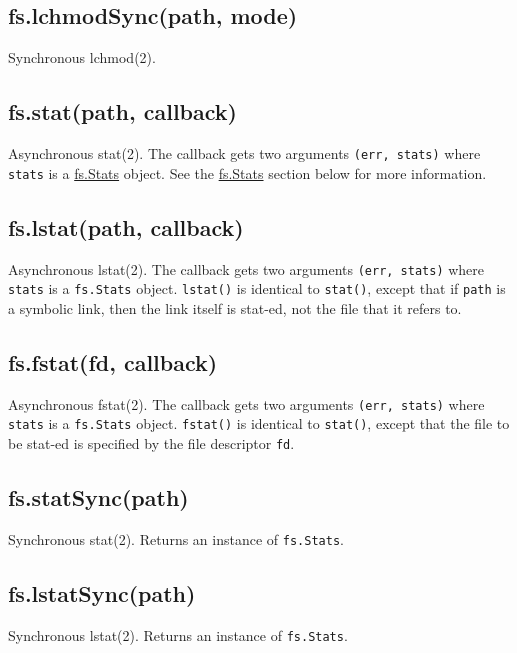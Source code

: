 \subsection{fs.lchmodSync(path, mode)}

Synchronous lchmod(2).

\subsection{fs.stat(path, callback)}

Asynchronous stat(2). The callback gets two arguments
\texttt{(err, stats)} where \texttt{stats} is a
\hyperref[fs_class_fs_stats]{fs.Stats} object. See the
\hyperref[fs_class_fs_stats]{fs.Stats} section below for more
information.

\subsection{fs.lstat(path, callback)}

Asynchronous lstat(2). The callback gets two arguments
\texttt{(err, stats)} where \texttt{stats} is a \texttt{fs.Stats}
object. \texttt{lstat()} is identical to \texttt{stat()}, except that if
\texttt{path} is a symbolic link, then the link itself is stat-ed, not
the file that it refers to.

\subsection{fs.fstat(fd, callback)}

Asynchronous fstat(2). The callback gets two arguments
\texttt{(err, stats)} where \texttt{stats} is a \texttt{fs.Stats}
object. \texttt{fstat()} is identical to \texttt{stat()}, except that
the file to be stat-ed is specified by the file descriptor \texttt{fd}.

\subsection{fs.statSync(path)}

Synchronous stat(2). Returns an instance of \texttt{fs.Stats}.

\subsection{fs.lstatSync(path)}

Synchronous lstat(2). Returns an instance of \texttt{fs.Stats}.

